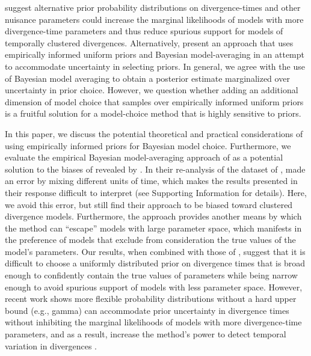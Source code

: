 \citet{Oaks2012} suggest alternative prior probability distributions on
divergence-times and other nuisance parameters could increase the marginal
likelihoods of models with more divergence-time parameters and thus reduce
spurious support for models of temporally clustered divergences.
Alternatively, \citet{Hickerson2013} present an approach that uses empirically
informed uniform priors and Bayesian model-averaging in an attempt to accommodate
uncertainty in selecting priors.
In general, we agree with the use of Bayesian model averaging to obtain a
posterior estimate marginalized over uncertainty in prior choice.
However, we question whether adding an additional dimension of model choice
that samples over empirically informed uniform priors is a fruitful solution
for a model-choice method that is highly sensitive to priors.

In this paper, we discuss the potential theoretical and practical
considerations of using empirically informed priors for Bayesian model choice.
Furthermore, we evaluate the empirical Bayesian model-averaging approach of
\citet{Hickerson2013} as a potential solution to the biases of \msb revealed by
\citet{Oaks2012}.
In their re-analysis of the dataset of \citet{Oaks2012}, \citet{Hickerson2013}
made an error by mixing different units of time, which makes the results
presented in their response difficult to interpret (see Supporting Information
for details).
Here, we avoid this error, but still find their approach to be biased toward
clustered divergence models.
Furthermore, the approach provides another means by which the method can
``escape'' models with large parameter space, which manifests in the preference
of models that exclude from consideration the true values of the model's
parameters.
Our results, when combined with those of \citet{Oaks2012}, suggest that it is
difficult to choose a uniformly distributed prior on divergence times that is
broad enough to confidently contain the true values of parameters while being
narrow enough to avoid spurious support of models with less parameter space.
However, recent work shows more flexible probability distributions without a
hard upper bound (e.g., gamma) can accommodate prior uncertainty in divergence
times without inhibiting the marginal likelihoods of models with more
divergence-time parameters, and as a result, increase the method's power to
detect temporal variation in divergences
\citep{Oaks2014dpp}.


